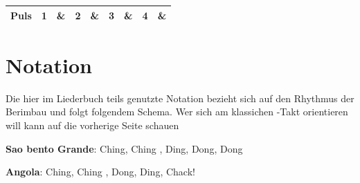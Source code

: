 \documentclass[fontsize=14pt, paper=a4, twoside, DIV=20]{scrreprt} %
\begin{document}
{\begin{center}
\begin{tabularx}{\textwidth}{|c|c|X|X|X|X|X|X|X|X|}
        \multicolumn{2}{|c|}{Puls}        & \textbf{ 1} & \textbf{\&}           & \textbf{2} & \textbf{\&}          & \textbf{3}          & \textbf{\&}           & \textbf{4} & \textbf{\&}            \\ \hline
\end{tabularx}
\end{center}


}





\chapter*{Notation}

Die hier im Liederbuch teils genutzte Notation bezieht sich auf den Rhythmus der Berimbau und folgt folgendem Schema. Wer sich am klassichen -Takt orientieren will kann auf die vorherige Seite schauen

\textbf{Sao bento Grande}: Ching,  Ching , Ding, Dong, Dong

\textbf{Angola}: Ching,  Ching , Dong, Ding, Chack!
\end{document}
